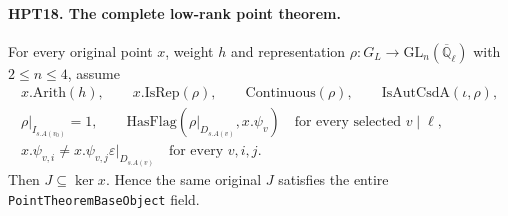 \documentclass[11pt,a4paper]{article}
\numberwithin{equation}{section}
\theoremstyle{remark}\newtheorem{remark}[theorem]{Remark}
\begin{document}
\paragraph{HPT18. The complete low-rank point theorem.}
\label{claim:HPT18}
For every original point $x$, weight $h$ and representation
$\rho:G_L\to\mathrm{GL}_n(\overline{\mathbb Q}_\ell)$ with
$2\leq n\leq4$, assume
\[
 \begin{gathered}
 x.\mathrm{Arith}(h),\qquad x.\mathrm{IsRep}(\rho),\qquad
 \mathrm{Continuous}(\rho),\qquad \mathrm{IsAutCsdA}(\iota,\rho),\\
 \rho|_{I_{s.A(v_0)}}=1,\qquad
 \mathrm{HasFlag}(\rho|_{D_{s.A(v)}},x.\psi_v)
                  \quad\text{for every selected }v\mid\ell,\\
 x.\psi_{v,i}\ne x.\psi_{v,j}\varepsilon|_{D_{s.A(v)}}
                          \quad\text{for every }v,i,j .
 \end{gathered}                                                 \tag{HPT.17}
\]
Then $J\subseteq\ker x$.  Hence the same original $J$ satisfies
the entire \texttt{Point\allowbreak Theorem\allowbreak Base\allowbreak Object} field.
\end{document}
